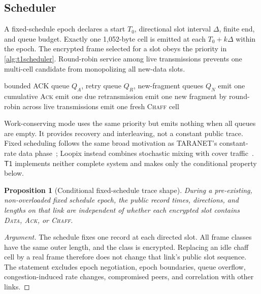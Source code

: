 \documentclass[11pt,oneside]{article}
\newcommand{\Tone}{\ensuremath{\mathsf{T1}}}
\newtheorem{proposition}{Proposition}
\begin{document}
\subsection{Scheduler}

A fixed-schedule epoch declares a start $T_0$, directional slot interval $\Delta$, finite end, and queue budget. Exactly one 1,052-byte cell is emitted at each $T_0+k\Delta$ within the epoch. The encrypted frame selected for a slot obeys the priority in \cref{alg:t1scheduler}. Round-robin service among live transmissions prevents one multi-cell candidate from monopolizing all new-data slots.

\begin{algorithm}[ht]
\caption{Fixed-schedule \Tone{} sender for one directed slot}
\label{alg:t1scheduler}
\begin{algorithmic}[1]
\Require bounded ACK queue $Q_A$, retry queue $Q_R$, new-fragment queues $Q_N$
  \State emit one cumulative \textsc{Ack}
  \State emit one due retransmission
  \State emit one new fragment by round-robin across live transmissions
\Else
  \State emit one fresh \textsc{Chaff} cell
\EndIf
\end{algorithmic}
\end{algorithm}

Work-conserving mode uses the same priority but emits nothing when all queues are empty. It provides recovery and interleaving, not a constant public trace. Fixed scheduling follows the same broad motivation as TARANET's constant-rate data phase~\cite{taranet}; Loopix instead combines stochastic mixing with cover traffic~\cite{loopix}. \Tone{} implements neither complete system and makes only the conditional property below.

\begin{proposition}[Conditional fixed-schedule trace shape]
During a pre-existing, non-overloaded fixed schedule epoch, the public record times, directions, and lengths on that link are independent of whether each encrypted slot contains \textsc{Data}, \textsc{Ack}, or \textsc{Chaff}.
\end{proposition}

\begin{proof}[Argument]
The schedule fixes one record at each directed slot. All frame classes have the same outer length, and the class is encrypted. Replacing an idle chaff cell by a real frame therefore does not change that link's public slot sequence. The statement excludes epoch negotiation, epoch boundaries, queue overflow, congestion-induced rate changes, compromised peers, and correlation with other links.
\end{proof}
\end{document}
